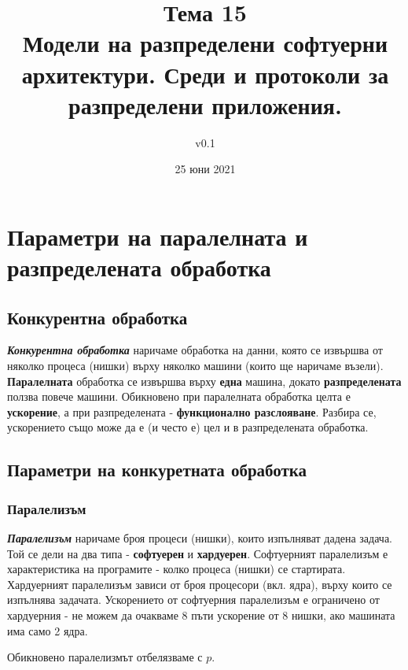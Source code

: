 \documentclass[fleqn,12pt]{article}
\title{Тема 15\\ Модели на разпределени софтуерни архитектури. Среди и протоколи за разпределени приложения.}
\author{v0.1}
\date{25 юни 2021}
\begin{document}
\maketitle
\tableofcontents
\pagebreak

\section{Параметри на паралелната и разпределената обработка}

\subsection{Конкурентна обработка}

\textbf{\textit{Конкурентна обработка}} наричаме обработка на данни, която се извършва от няколко процеса (нишки)
върху няколко машини (които ще наричаме възели). \textbf{Паралелната} обработка се извършва върху \textbf{една} машина,
докато \textbf{разпределената} ползва повече машини. Обикновено при паралелната обработка целта е \textbf{ускорение},
а при разпределената - \textbf{функционално разслояване}. Разбира се, ускорението също може да е (и често е) цел 
и в разпределената обработка.

\subsection{Параметри на конкуретната обработка}

\subsubsection{Паралелизъм}
\textbf{\textit{Паралелизъм}} наричаме броя процеси (нишки), които изпълняват дадена задача.
Той се дели на два типа - \textbf{софтуерен} и \textbf{хардуерен}. Софтуерният паралелизъм е 
характеристика на програмите - колко процеса (нишки) се стартирата. Хардуерният паралелизъм 
зависи от броя процесори (вкл. ядра), върху които се изпълнява задачата.
Ускорението от софтуерния паралелизъм е ограничено от хардуерния - не можем да очакваме 
8 пъти ускорение от 8 нишки, ако машината има само 2 ядра.

Обикновено паралелизмът отбелязваме с $p$.
\end{document}
